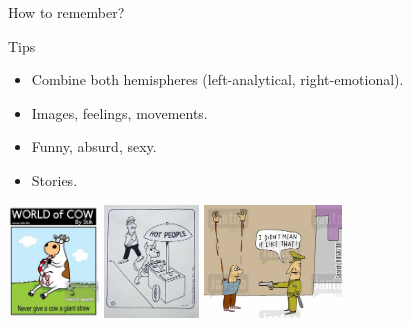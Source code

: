 \begin{frame}{How to remember?}
  \begin{block}{Tips}
    \begin{itemize}
      \item Combine both hemispheres (left-analytical, right-emotional).
      \item Images, feelings, movements. 
      \item Funny, absurd, sexy. 
      \item Stories. 
    \end{itemize}
  \end{block}
  \begin{center}
    \includegraphics[height=3cm]{img/cow.jpg}
    \includegraphics[height=3cm]{img/hot-people.jpg}
    \includegraphics[height=3cm]{img/hands-up.jpg}
  \end{center}
\end{frame}

